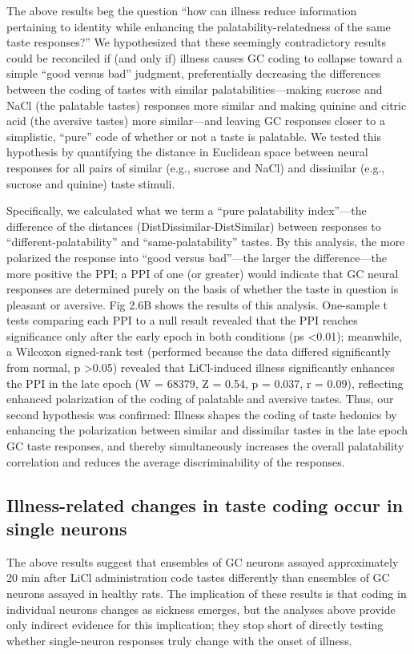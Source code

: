 \begin{refsection}
The above results beg the question “how can illness reduce information pertaining to identity while enhancing the palatability-relatedness of the same taste responses?” We hypothesized that these seemingly contradictory results could be reconciled if (and only if) illness causes GC coding to collapse toward a simple “good versus bad” judgment, preferentially decreasing the differences between the coding of tastes with similar palatabilities—making sucrose and NaCl (the palatable tastes) responses more similar and making quinine and citric acid (the aversive tastes) more similar—and leaving GC responses closer to a simplistic, “pure” code of whether or not a taste is palatable. We tested this hypothesis by quantifying the distance in Euclidean space between neural responses for all pairs of similar (e.g., sucrose and NaCl) and dissimilar (e.g., sucrose and quinine) taste stimuli.

Specifically, we calculated what we term a “pure palatability index”—the difference of the distances (DistDissimilar-DistSimilar) between responses to “different-palatability” and “same-palatability” tastes. By this analysis, the more polarized the response into “good versus bad”—the larger the difference—the more positive the PPI; a PPI of one (or greater) would indicate that GC neural responses are determined purely on the basis of whether the taste in question is pleasant or aversive. Fig 2.6B shows the results of this analysis. One-sample t tests comparing each PPI to a null result revealed that the PPI reaches significance only after the early epoch in both conditions (ps \textless 0.01); meanwhile, a Wilcoxon signed-rank test (performed because the data differed significantly from normal, p \textgreater0.05) revealed that LiCl-induced illness significantly enhances the PPI in the late epoch (W = 68379, Z = 0.54, p = 0.037, r = 0.09), reflecting enhanced polarization of the coding of palatable and aversive tastes. Thus, our second hypothesis was confirmed: Illness shapes the coding of taste hedonics by enhancing the polarization between similar and dissimilar tastes in the late epoch GC taste responses, and thereby simultaneously increases the overall palatability correlation and reduces the average discriminability of the responses.

\subsection{Illness-related changes in taste coding occur in single neurons}
The above results suggest that ensembles of GC neurons assayed approximately 20 min after LiCl administration code tastes differently than ensembles of GC neurons assayed in healthy rats. The implication of these results is that coding in individual neurons changes as sickness emerges, but the analyses above provide only indirect evidence for this implication; they stop short of directly testing whether single-neuron responses truly change with the onset of illness.


\end{refsection}
